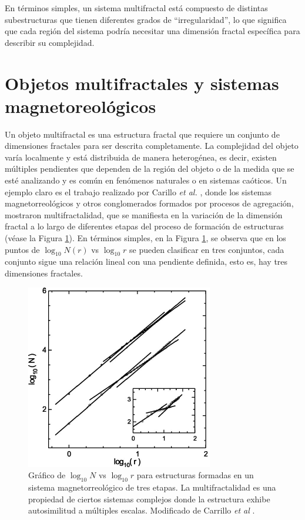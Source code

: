 En t\'{e}rminos simples, un sistema multifractal est\'{a} compuesto de distintas subestructuras que tienen diferentes grados de ``irregularidad'', lo que significa que cada regi\'{o}n del sistema podr\'{i}a necesitar una dimensi\'{o}n fractal espec\'{i}fica para describir su complejidad.

\section{Objetos multifractales y sistemas magnetoreol\'{o}gicos}
\label{sistemasmagneto}

Un objeto multifractal es una estructura fractal que requiere un conjunto de dimensiones fractales para ser descrita completamente. La complejidad del objeto var\'{i}a localmente y est\'{a} distribuida de manera heterog\'{e}nea, es decir, existen m\'{u}ltiples pendientes que dependen de la regi\'{o}n del objeto o de la medida que se est\'{e} analizando y es com\'{u}n en fen\'{o}menos naturales o en sistemas ca\'{o}ticos. Un ejemplo claro es el trabajo realizado por Carillo \textit{et al.} \cite{Carrillo2003}, donde los sistemas 
magnetorreol\'{o}gicos y otros conglomerados formados por procesos de agregaci\'{o}n, mostraron multifractalidad, que se manifiesta en la variaci\'{o}n de la dimensi\'{o}n fractal a lo largo de diferentes etapas del proceso de formaci\'{o}n 
de estructuras (v\'{e}ase la Figura \ref{fig:Carrillo-Fractal}). En t\'{e}rminos simples, en la Figura \ref{fig:Carrillo-Fractal}, se observa que en los puntos de $\log_{10}N(r)$ vs $\log_{10}r$ se pueden clasificar en tres conjuntos, cada conjunto sigue una relaci\'{o}n lineal con una pendiente definida, esto es, hay tres dimensiones fractales.


\begin{figure}[H]
	\begin{center}
		\includegraphics[width=0.5\linewidth]{graphs/Carrillo2003}
		\caption{Gr\'{a}fico de $\log_{10}N$ vs $\log_{10}r$ para estructuras formadas en un sistema magnetorreol\'{o}gico de tres etapas. La multifractalidad es una propiedad de ciertos sistemas complejos donde la estructura exhibe autosimilitud a m\'{u}ltiples  escalas. Modificado de Carrillo \textit{et al} \cite{Carrillo2003}.}
		\label{fig:Carrillo-Fractal}
	\end{center}
\end{figure}

